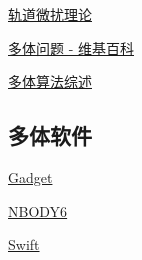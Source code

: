 
\begin{issues}
\issueDraft
\end{issues}

\href{https://en.wikipedia.org/wiki/Orbit_modeling}{轨道微扰理论}

\href{https://en.wikipedia.org/wiki/N-body_problem}{多体问题 - 维基百科}

\href{https://arxiv.org/abs/0806.3950v1}{多体算法综述}

\subsection{多体软件}
\href{https://wwwmpa.mpa-garching.mpg.de/gadget/}{Gadget}

\href{https://people.ast.cam.ac.uk/~sverre/web/pages/nbody.htm}{NBODY6}

\href{https://www.boulder.swri.edu/~hal/swift.html}{Swift}
